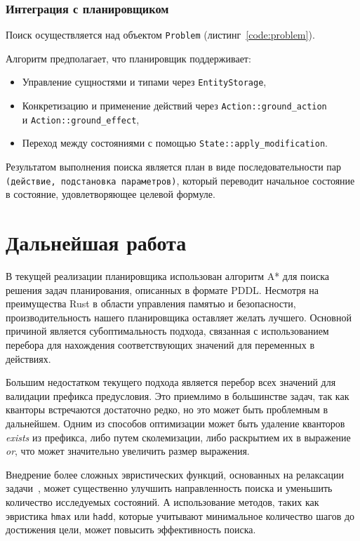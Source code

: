 \documentclass{article}
\begin{document}
\subsubsection{Интеграция с планировщиком}

Поиск осуществляется над объектом \texttt{Problem} (листинг~\ref{code:problem}).

Алгоритм предполагает, что планировщик поддерживает:
\begin{itemize}
    \item Управление сущностями и типами через \texttt{EntityStorage},
    \item Конкретизацию и применение действий через \texttt{Action::ground\_action}\\
      и \texttt{Action::ground\_effect},
    \item Переход между состояниями с помощью \texttt{State::apply\_modification}.
\end{itemize}

Результатом выполнения поиска является план в виде последовательности пар \texttt{(действие, подстановка параметров)},
который переводит начальное состояние в состояние, удовлетворяющее целевой формуле.

\section{Дальнейшая работа}

В текущей реализации планировщика использован алгоритм A* для поиска решения задач планирования, описанных в формате PDDL.
Несмотря на преимущества Rust в области управления памятью и безопасности, производительность нашего планировщика оставляет желать лучшего.
Основной причиной является субоптимальность подхода, связанная с использованием перебора для нахождения соответствующих значений для переменных в действиях.

Большим недостатком текущего подхода является перебор всех значений для валидации префикса предусловия.
Это приемлимо в большинстве задач, так как кванторы встречаются достаточно редко, но это может быть проблемным в дальнейшем.
Одним из способов оптимизации может быть удаление кванторов \textit{exists} из префикса,
либо путем сколемизации, либо раскрытием их в выражение \textit{or}, что может значительно увеличить размер выражения.

Внедрение более сложных эвристических функций, основанных на релаксации задачи~\cite{stolba2014relaxation},
может существенно улучшить направленность поиска и уменьшить количество исследуемых состояний.
А использование методов, таких как эвристика \texttt{hmax} или \texttt{hadd},
которые учитывают минимальное количество шагов до достижения цели, может повысить эффективность поиска.
\end{document}
